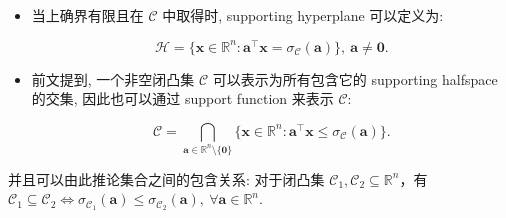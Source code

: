 \begin{itemize}
\item {}当上确界有限且在 $\mathcal{C}$ 中取得时, supporting hyperplane 可以定义为:

\[
\mathcal{H} = \{\bm{x} \in \mathbb{R}^n: \bm{a}^\top \bm{x} = \sigma_{\mathcal{C}}(\bm{a})\},~ \bm{a} \neq \bm{0}.
\]


\end{itemize}


\begin{propositionblock}
\begin{itemize}
\item {}前文提到, 一个非空闭凸集 $\mathcal{C}$ 可以表示为所有包含它的 supporting halfspace 的交集, 因此也可以通过 support function 来表示 $\mathcal{C}$:

\[
\mathcal{C} = \bigcap_{\bm{a} \in \mathbb{R}^n \setminus \{\bm{0}\}} \{\bm{x} \in \mathbb{R}^n: \bm{a}^\top \bm{x} \leq \sigma_{\mathcal{C}}(\bm{a})\}.
\]


\end{itemize}

\end{propositionblock}

并且可以由此推论集合之间的包含关系: 对于闭凸集 $\mathcal{C}_1, \mathcal{C}_2 \subseteq \mathbb{R}^n$，有 $\mathcal{C}_1 \subseteq \mathcal{C}_2 \iff \sigma_{\mathcal{C}_1}(\bm{a}) \leq \sigma_{\mathcal{C}_2}(\bm{a}),~ \forall \bm{a} \in \mathbb{R}^n$.


